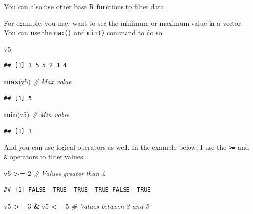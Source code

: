 \documentclass[
]{book}
\newenvironment{Shaded}{\begin{snugshade}}{\end{snugshade}}
\newcommand{\CommentTok}[1]{\textcolor[rgb]{0.56,0.35,0.01}{\textit{#1}}}
\newcommand{\DecValTok}[1]{\textcolor[rgb]{0.00,0.00,0.81}{#1}}
\newcommand{\KeywordTok}[1]{\textcolor[rgb]{0.13,0.29,0.53}{\textbf{#1}}}
\newcommand{\NormalTok}[1]{#1}
\newcommand{\OperatorTok}[1]{\textcolor[rgb]{0.81,0.36,0.00}{\textbf{#1}}}
\newcommand{\StringTok}[1]{\textcolor[rgb]{0.31,0.60,0.02}{#1}}
\begin{document}
You can also use other base R functions to filter data.

For example, you may want to see the minimum or maximum value in a vector. You can use the \texttt{max()} and \texttt{min()} command to do so.

\begin{Shaded}
\begin{Highlighting}[]
\NormalTok{v5}
\end{Highlighting}
\end{Shaded}

\begin{verbatim}
## [1] 1 5 5 2 1 4
\end{verbatim}

\begin{Shaded}
\begin{Highlighting}[]
\KeywordTok{max}\NormalTok{(v5) }\CommentTok{# Max value}
\end{Highlighting}
\end{Shaded}

\begin{verbatim}
## [1] 5
\end{verbatim}

\begin{Shaded}
\begin{Highlighting}[]
\KeywordTok{min}\NormalTok{(v5) }\CommentTok{# Min value}
\end{Highlighting}
\end{Shaded}

\begin{verbatim}
## [1] 1
\end{verbatim}

And you can use logical operators as well. In the example below, I use the \texttt{\textgreater{}=} and \texttt{\&} operators to filter values:

\begin{Shaded}
\begin{Highlighting}[]
\NormalTok{v5 }\OperatorTok{>=}\StringTok{ }\DecValTok{2} \CommentTok{# Values greater than 2}
\end{Highlighting}
\end{Shaded}

\begin{verbatim}
## [1] FALSE  TRUE  TRUE  TRUE FALSE  TRUE
\end{verbatim}

\begin{Shaded}
\begin{Highlighting}[]
\NormalTok{v5 }\OperatorTok{>=}\StringTok{ }\DecValTok{3} \OperatorTok{&}\StringTok{ }\NormalTok{v5 }\OperatorTok{<=}\StringTok{ }\DecValTok{5} \CommentTok{# Values between 3 and 5}
\end{Highlighting}
\end{Shaded}
\end{document}
